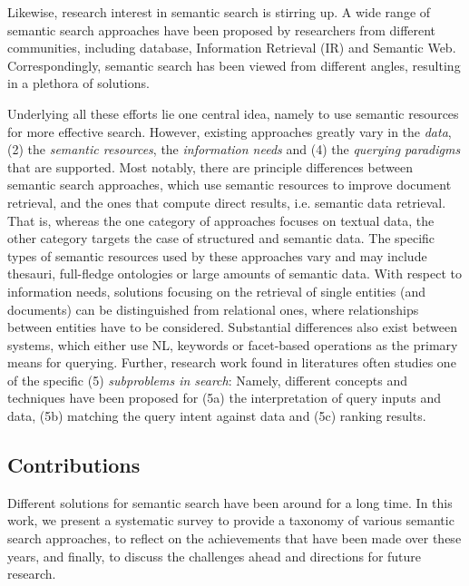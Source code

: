 Likewise, research interest in semantic search is stirring up. A wide range of semantic search approaches have been proposed by researchers from different communities, including database, Information Retrieval (IR) and Semantic Web. Correspondingly, semantic search has been viewed from different angles, resulting in a plethora of solutions. 

Underlying all these efforts lie one central idea, namely to use semantic resources for more effective search. However, existing approaches greatly vary in the \emph{data}, (2) the \emph{semantic resources}, the \emph{information needs} and (4) the \emph{querying paradigms} that are supported. Most notably, there are principle differences between semantic search approaches, which use semantic resources to improve document retrieval, and the ones that compute direct results, i.e. semantic data retrieval. That is, whereas the one category of approaches focuses on textual data, the other category targets the case of structured and semantic data. The specific types of semantic resources used by these approaches vary and may include thesauri, full-fledge ontologies or large amounts of semantic data. With respect to information needs, solutions focusing on the retrieval of single entities (and documents) can be distinguished from relational ones, where relationships between entities have to be considered. Substantial differences also exist between systems, which either use NL, keywords or facet-based operations as the primary means for querying. Further, research work found in literatures often studies one of the specific (5) \emph{subproblems in search}: Namely, different concepts and techniques have been proposed for (5a) the interpretation of query inputs and data, (5b) matching the query intent against data and (5c) ranking results.  

\subsection{Contributions}
Different solutions for semantic search have been around for a long time. In this work, we present a systematic survey to provide a taxonomy of various semantic search approaches, to reflect on the achievements that have been made over these years, and finally, to discuss the challenges ahead and directions for future research. 

